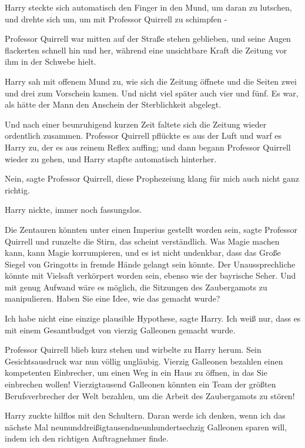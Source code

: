 Harry steckte sich automatisch den Finger in den Mund, um daran zu lutschen, und
drehte sich um, um mit Professor Quirrell zu schimpfen -

Professor Quirrell war mitten auf der Straße stehen geblieben, und seine Augen
flackerten schnell hin und her, während eine unsichtbare Kraft die Zeitung vor
ihm in der Schwebe hielt.

Harry sah mit offenem Mund zu, wie sich die Zeitung öffnete und die Seiten zwei
und drei zum Vorschein kamen. Und nicht viel später auch vier und fünf. Es war,
als hätte der Mann den Anschein der Sterblichkeit abgelegt.

Und nach einer beunruhigend kurzen Zeit faltete sich die Zeitung wieder
ordentlich zusammen. Professor Quirrell pflückte es aus der Luft und warf es
Harry zu, der es aus reinem Reflex auffing; und dann begann Professor Quirrell
wieder zu gehen, und Harry stapfte automatisch hinterher.

\glqq{}Nein\grqq{}, sagte Professor Quirrell, \glqq{}diese Prophezeiung klang
für mich auch nicht ganz richtig.\grqq{}

Harry nickte, immer noch fassungslos.

\glqq{}Die Zentauren könnten unter einen Imperius gestellt worden sein\grqq{},
sagte Professor Quirrell und runzelte die Stirn, \glqq{}das scheint
verständlich. Was Magie machen kann, kann Magie korrumpieren, und es ist nicht
undenkbar, dass das Große Siegel von Gringotts in fremde Hände gelangt sein
könnte. Der Unaussprechliche könnte mit Vielsaft verkörpert worden sein, ebenso
wie der bayrische Seher. Und mit genug Aufwand wäre es möglich, die Sitzungen
des Zaubergamots zu manipulieren. Haben Sie eine Idee, wie das gemacht
wurde?\grqq{}

\glqq{}Ich habe nicht eine einzige plausible Hypothese\grqq{}, sagte Harry.
\glqq{}Ich weiß nur, dass es mit einem Gesamtbudget von vierzig Galleonen
gemacht wurde.\grqq{}

Professor Quirrell blieb kurz stehen und wirbelte zu Harry herum. Sein
Gesichtsausdruck war nun völlig ungläubig. \glqq{}Vierzig Galleonen bezahlen
einen kompetenten Einbrecher, um einen Weg in ein Haus zu öffnen, in das Sie
einbrechen wollen! Vierzigtausend Galleonen könnten ein Team der größten
Berufsverbrecher der Welt bezahlen, um die Arbeit des Zaubergamots zu
stören!\grqq{}

Harry zuckte hilflos mit den Schultern. \glqq{}Daran werde ich denken, wenn ich
das nächste Mal neununddreißigtausendneunhundertsechzig Galleonen sparen will,
indem ich den richtigen Auftragnehmer finde.\grqq{}

